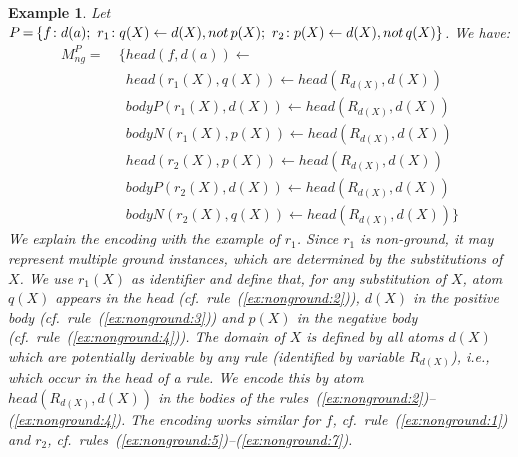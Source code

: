 \documentclass[11pt,fleqn,twoside]{article}
\def\naf{\ensuremath{\mathop{not}}}
\newtheorem{example}{Example}
\begin{document}
			\begin{example}
				\label{ex:nonground}
				Let $P \hspace{-0.3mm}=\hspace{-0.3mm} \{ f\colon\hspace{-0.15mm} d(a); \ r_1\colon\hspace{-0.15mm} q(X) \leftarrow d(X), \naf p(X); \ r_2\colon\hspace{-0.15mm} p(X) \leftarrow d(X), \naf q(X) \}$.
				We have:
				{
				\begin{align}
					M^P_{\mathit{ng}} =& \ \{ \mathit{head}(f, d(a)) \leftarrow \label{ex:nonground:1} \\
						& \phantom{\ \{} \mathit{head}(r_1(X), q(X)) \leftarrow \mathit{head}(R_{d(X)},d(X)) \label{ex:nonground:2} \\
						& \phantom{\ \{} \mathit{bodyP}(r_1(X), d(X)) \leftarrow \mathit{head}(R_{d(X)},d(X)) \label{ex:nonground:3} \\
						& \phantom{\ \{} \mathit{bodyN}(r_1(X), p(X)) \leftarrow \mathit{head}(R_{d(X)},d(X)) \label{ex:nonground:4} \\
						& \phantom{\ \{} \mathit{head}(r_2(X), p(X)) \leftarrow \mathit{head}(R_{d(X)},d(X)) \label{ex:nonground:5} \\
						& \phantom{\ \{} \mathit{bodyP}(r_2(X), d(X)) \leftarrow \mathit{head}(R_{d(X)},d(X)) \label{ex:nonground:6} \\
						& \phantom{\ \{} \mathit{bodyN}(r_2(X), q(X)) \leftarrow \mathit{head}(R_{d(X)},d(X)) \label{ex:nonground:7} \}
				\end{align}%
				}%
				We explain the encoding with the example of $r_1$. Since $r_1$ is non-ground, it may represent multiple ground instances, which are determined by the substitutions of $X$.
				We use $r_1(X)$ as identifier and define that, for any substitution of $X$, atom $q(X)$ appears in the head (cf.~rule~(\ref{ex:nonground:2})),
				$d(X)$ in the positive body (cf.~rule~(\ref{ex:nonground:3})) and $p(X)$ in the negative body (cf.~rule~(\ref{ex:nonground:4})).
				The domain of $X$ is defined by all atoms $d(X)$ which are potentially derivable by any rule (identified by variable $R_{d(X)}$),
				i.e., which occur in the head of a rule. We encode this by atom $\mathit{head}(R_{d(X)},d(X))$ in the bodies of the rules~(\ref{ex:nonground:2})--(\ref{ex:nonground:4}).
				The encoding works similar for $f$, cf.~rule~(\ref{ex:nonground:1}) and $r_2$, cf.~rules~(\ref{ex:nonground:5})--(\ref{ex:nonground:7}).
			\end{example}
\end{document}
